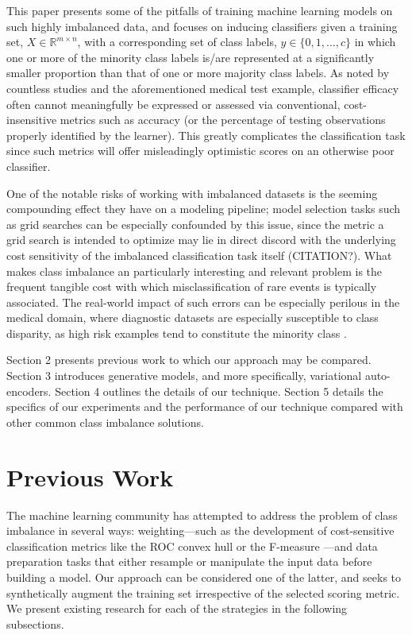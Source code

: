 \documentclass[twoside,11pt]{article}
\begin{document}
This paper presents some of the pitfalls of training machine learning models on such highly imbalanced data, and focuses on inducing classifiers given a training set, $X \in \mathbb{R}^{m \times n}$, with a corresponding set of class labels, $y \in \{0, 1, ..., c\}$ in which one or more of the minority class labels is/are represented at a significantly smaller proportion than that of one or more majority class labels. As noted by countless studies and the aforementioned medical test example, classifier efficacy often cannot meaningfully be expressed or assessed via conventional, cost-insensitive metrics such as accuracy (or the percentage of testing observations properly identified by the learner). This greatly complicates the classification task since such metrics will offer misleadingly optimistic scores on an otherwise poor classifier.

One of the notable risks of working with imbalanced datasets is the seeming compounding effect they have on a modeling pipeline; model selection tasks such as grid searches can be especially confounded by this issue, since the metric a grid search is intended to optimize may lie in direct discord with the underlying cost sensitivity of the imbalanced classification task itself (CITATION?). What makes class imbalance an particularly interesting and relevant problem is the frequent tangible cost with which misclassification of rare events is typically associated. The real-world impact of such errors can be especially perilous in the medical domain, where diagnostic datasets are especially susceptible to class disparity, as high risk examples tend to constitute the minority class \citep{rahman2013addressing}.

Section 2 presents previous work to which our approach may be compared. Section 3 introduces generative models, and more specifically, variational auto-encoders. Section 4 outlines the details of our technique. Section 5 details the specifics of our experiments and the performance of our technique compared with other common class imbalance solutions. \\

\section{Previous Work}

The machine learning community has attempted to address the problem of class imbalance in several ways: weighting---such as the development of cost-sensitive classification metrics like the ROC convex hull \citep{provost2001robust} or the F-measure \citep{lewis1994training}---and data preparation tasks that either resample or manipulate the input data before building a model. Our approach can be considered one of the latter, and seeks to synthetically augment the training set irrespective of the selected scoring metric. We present existing research for each of the strategies in the following subsections.
\end{document}
